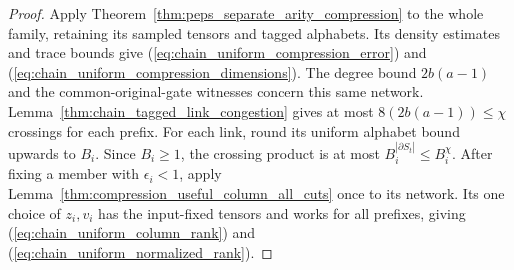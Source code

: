 \begin{proof}\leanok
    Apply Theorem~\ref{thm:peps_separate_arity_compression} to the
    whole family, retaining its sampled tensors and tagged alphabets.
    Its density estimates and trace bounds give
    (\ref{eq:chain_uniform_compression_error}) and
    (\ref{eq:chain_uniform_compression_dimensions}).
    The degree bound $2b(a-1)$ and the common-original-gate witnesses
    concern this same network. Lemma~\ref{thm:chain_tagged_link_congestion}
    gives at most $8(2b(a-1))\le\chi$ crossings for each prefix.
    For each link, round its uniform alphabet bound upwards to $B_i$.
    Since $B_i\ge1$, the crossing product is at most
    $B_i^{|\partial S_t|}\le B_i^{\chi}$.
    After fixing a member with $\epsilon_i<1$, apply
    Lemma~\ref{thm:compression_useful_column_all_cuts} once to its
    network. Its one choice of $z_i,v_i$ has the
    input-fixed tensors and works for all prefixes, giving
    (\ref{eq:chain_uniform_column_rank}) and
    (\ref{eq:chain_uniform_normalized_rank}).
\end{proof}

